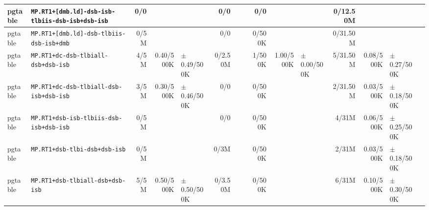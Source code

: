 \begin{tabular}{l l  | r r l | r r l | r r l | r r l l}
         pgtable &      \verb|MP.RT1+[dmb.ld]-dsb-isb-tlbiis-dsb-isb+dsb-isb| &            0/0 &                       &                   &            0/0 &                       &                 &            0/0 &                       &                   &       0/12.50M &                       &                   & \\ \hline 
         pgtable &              \verb|MP.RT1+[dmb.ld]-dsb-tlbiis-dsb-isb+dmb| &           0/5M &                       &                   &            0/0 &                       &                 &         0/500K &                       &                   &       0/31.50M &                       &                   & \\ \hline 
         pgtable &                   \verb|MP.RT1+dc-dsb-tlbiall-dsb+dsb-isb| &           4/5M &             0.40/500K &   $\pm$ 0.49/500K &        0/2.50M &                       &                 &         1/500K &             1.00/500K &   $\pm$ 0.00/500K &       5/31.50M &             0.08/500K &   $\pm$ 0.27/500K & \\ \hline 
         pgtable &               \verb|MP.RT1+dc-dsb-tlbiall-dsb-isb+dsb-isb| &           3/5M &             0.30/500K &   $\pm$ 0.46/500K &            0/0 &                       &                 &         0/500K &                       &                   &       2/31.50M &             0.03/500K &   $\pm$ 0.18/500K & \\ \hline 
         pgtable &               \verb|MP.RT1+dsb-isb-tlbiis-dsb-isb+dsb-isb| &           0/5M &                       &                   &            0/0 &                       &                 &         0/500K &                       &                   &          4/31M &             0.06/500K &   $\pm$ 0.25/500K & \\ \hline 
         pgtable &                         \verb|MP.RT1+dsb-tlbi-dsb+dsb-isb| &           0/5M &                       &                   &           0/3M &                       &                 &         0/500K &                       &                   &          2/31M &             0.03/500K &   $\pm$ 0.18/500K & \\ \hline 
         pgtable &                      \verb|MP.RT1+dsb-tlbiall-dsb+dsb-isb| &           5/5M &             0.50/500K &   $\pm$ 0.50/500K &        0/3.50M &                       &                 &         0/500K &                       &                   &          6/31M &             0.10/500K &   $\pm$ 0.30/500K & \\ \hline 

\end{tabular}
